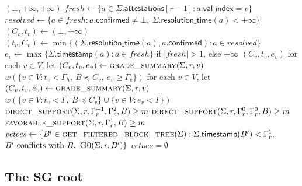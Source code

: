 \documentclass{article}
\theoremstyle{plain}
\theoremstyle{definition}
\theoremstyle{remark}
\newcommand{\valindex}{\mathsf{val\_index}}
\newcommand{\confirmedf}{\mathsf{confirmed}}
\newcommand{\attestations}{\mathsf{attestations}}
\newcommand{\timestamp}{\mathsf{timestamp}}
\newcommand{\resolutionTime}{\mathsf{resolution\_time}}
\begin{document}
\label{alg:grades}
\nopagebreak
{\footnotesize
\begin{algorithmic}[1]
   \State \Return $(\bot,+\infty,+\infty)$ \EndIf
  \State $\mathit{fresh}\gets
    \{a\in\Sigma.\attestations[r-1]:
    a.\valindex=v\}$
  \State $\mathit{resolved}\gets\{a\in\mathit{fresh}:
    a.\confirmedf\neq\bot,\ \Sigma.\resolutionTime(a)<+\infty\}$
    \State $(C_v,t_v)\gets(\bot,+\infty)$
  \Else
    \State $(t_v,C_v)\gets
      \min\{(\Sigma.\resolutionTime(a),a.\confirmedf):
      a\in\mathit{resolved}\}$
  \EndIf
  \State $e_v\gets\max\{\Sigma.\timestamp(a):
    a\in\mathit{fresh}\}$ if
  $|\mathit{fresh}|>1$, else $+\infty$
  \State \Return $(C_v,t_v,e_v)$
\EndFunction
\vspace{1pt}
  \State for each $v\in V$, let
    $(C_v,t_v,e_v)\gets\Call{grade\_summary}{\Sigma,r,v}$
  \State \Return $w(\{v\in V:t_v<\Gamma_h,\ B\preceq C_v,\
    e_v\geq\Gamma_e\})$
\EndFunction
\vspace{1pt}
  \State for each $v\in V$, let
    $(C_v,t_v,e_v)\gets\Call{grade\_summary}{\Sigma,r,v}$
  \State \Return $w(\{v\in V:t_v<\Gamma,\ B\preceq C_v\}
    \cup\{v\in V:e_v<\Gamma\})$
\EndFunction
\vspace{1pt}
  \State \Return $\Call{direct\_support}{\Sigma,r,\Gamma_r^{-1},
    \Gamma_r^2,B}\geq m$
\EndFunction
\vspace{1pt}
  \State \Return $\Call{direct\_support}{\Sigma,r,\Gamma_r^0,
    \Gamma_r^0,B}\geq m$
\EndFunction
\vspace{1pt}
  \State \Return $\Call{favorable\_support}{\Sigma,r,\Gamma_r^1,B}
    \geq m$
\EndFunction
\vspace{1pt}
  \State $\mathit{vetoes}\gets
    \{B'\in\Call{get\_filtered\_block\_tree}{\Sigma}:
    \Sigma.\timestamp(B')<\Gamma_r^1,$
  \Statex \hspace{4.35em} $B'\text{ conflicts with }B,\
    \Call{G0}{\Sigma,r,B'}\}$
  \State \Return $\mathit{vetoes}=\emptyset$
\EndFunction
\end{algorithmic}
}

\subsection{The SG root}\label{sec:fresh-anchor}
\end{document}
